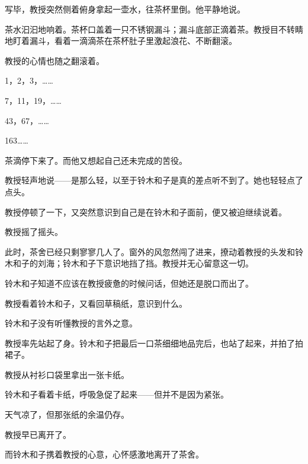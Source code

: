 写毕，教授突然侧着俯身拿起一壶水，往茶杯里倒。他平静地说。


茶水汩汩地响着。茶杯口盖着一只不锈钢漏斗；漏斗底部正滴着茶。教授目不转睛地盯着漏斗，看着一滴滴茶在茶杯肚子里激起浪花、不断翻滚。

教授的心情也随之翻滚着。

1，2，3，……

7，11，19，……

43，67，……

163……

茶滴停下来了。而他又想起自己还未完成的苦役。

教授轻声地说——是那么轻，以至于铃木和子是真的差点听不到了。她也轻轻点了点头。


教授停顿了一下，又突然意识到自己是在铃木和子面前，便又被迫继续说着。

教授摇了摇头。

此时，茶舍已经只剩寥寥几人了。窗外的风忽然闯了进来，撩动着教授的头发和铃木和子的刘海；铃木和子下意识地挡了挡。教授并无心留意这一切。



铃木和子知道不应该在教授疲惫的时候问话，但她还是脱口而出了。

教授看着铃木和子，又看回草稿纸，意识到什么。


铃木和子没有听懂教授的言外之意。

教授率先站起了身。铃木和子把最后一口茶细细地品完后，也站了起来，并拍了拍裙子。

教授从衬衫口袋里拿出一张卡纸。

铃木和子看着卡纸，呼吸急促了起来——但并不是因为紧张。

\clearpage
\myblankpage


天气凉了，但那张纸的余温仍存。

教授早已离开了。

而铃木和子携着教授的心意，心怀感激地离开了茶舍。







